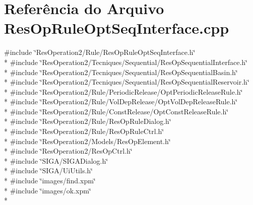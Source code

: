 \section{Referência do Arquivo Res\+Op\+Rule\+Opt\+Seq\+Interface.\+cpp}
\label{_res_op_rule_opt_seq_interface_8cpp}
{\ttfamily \#include \char`\"{}Res\+Operation2/\+Rule/\+Res\+Op\+Rule\+Opt\+Seq\+Interface.\+h\char`\"{}}\\*
{\ttfamily \#include \char`\"{}Res\+Operation2/\+Tecniques/\+Sequential/\+Res\+Op\+Sequential\+Interface.\+h\char`\"{}}\\*
{\ttfamily \#include \char`\"{}Res\+Operation2/\+Tecniques/\+Sequential/\+Res\+Op\+Sequential\+Basin.\+h\char`\"{}}\\*
{\ttfamily \#include \char`\"{}Res\+Operation2/\+Tecniques/\+Sequential/\+Res\+Op\+Sequential\+Reservoir.\+h\char`\"{}}\\*
{\ttfamily \#include \char`\"{}Res\+Operation2/\+Rule/\+Periodic\+Release/\+Opt\+Periodic\+Release\+Rule.\+h\char`\"{}}\\*
{\ttfamily \#include \char`\"{}Res\+Operation2/\+Rule/\+Vol\+Dep\+Release/\+Opt\+Vol\+Dep\+Release\+Rule.\+h\char`\"{}}\\*
{\ttfamily \#include \char`\"{}Res\+Operation2/\+Rule/\+Const\+Release/\+Opt\+Const\+Release\+Rule.\+h\char`\"{}}\\*
{\ttfamily \#include \char`\"{}Res\+Operation2/\+Rule/\+Res\+Op\+Rule\+Dialog.\+h\char`\"{}}\\*
{\ttfamily \#include \char`\"{}Res\+Operation2/\+Rule/\+Res\+Op\+Rule\+Ctrl.\+h\char`\"{}}\\*
{\ttfamily \#include \char`\"{}Res\+Operation2/\+Models/\+Res\+Op\+Element.\+h\char`\"{}}\\*
{\ttfamily \#include \char`\"{}Res\+Operation2/\+Res\+Op\+Ctrl.\+h\char`\"{}}\\*
{\ttfamily \#include \char`\"{}S\+I\+G\+A/\+S\+I\+G\+A\+Dialog.\+h\char`\"{}}\\*
{\ttfamily \#include \char`\"{}S\+I\+G\+A/\+Ui\+Utils.\+h\char`\"{}}\\*
{\ttfamily \#include \char`\"{}images/find.\+xpm\char`\"{}}\\*
{\ttfamily \#include \char`\"{}images/ok.\+xpm\char`\"{}}\\*
